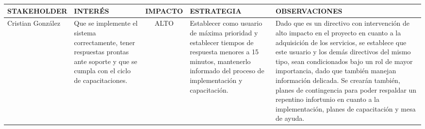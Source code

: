 \begin{table}[H]
	\centering
	\begin{tabular}{| p{3cm} | p{5cm} | c | p{5cm} | p{5cm} |}
	\hline
	\rowcolor{LightGrey}
	\textbf{STAKEHOLDER} & \textbf{INTER\'ES} & \textbf{IMPACTO} & \textbf{ESTRATEGIA} & 
	\textbf{OBSERVACIONES} \\ \hline

	Cristian Gonz\'alez	& Que se implemente el sistema correctamente, tener respuestas prontas
	ante soporte y que se cumpla con el ciclo de capacitaciones. & ALTO & Establecer como 
	usuario de m\'axima prioridad y establecer tiempos de respuesta menores a 15 minutos, 
	mantenerlo informado del proceso de implementaci\'on y capacitaci\'on. & Dado que es un directivo 
	con intervenci\'on de alto impacto en el proyecto en cuanto a la adquisici\'on de los servicios,
	se establece que este usuario y los dem\'as directivos del mismo tipo, sean condicionados bajo un
	rol de mayor importancia, dado que tambi\'en manejan informaci\'on delicada. Se crear\'an tambi\'en,
	planes de contingencia para poder respaldar un repentino infortunio en cuanto a la implementaci\'on,
	planes de capacitaci\'on y mesa de ayuda.\\
	\hline
	\end{tabular}
\end{table}
%
